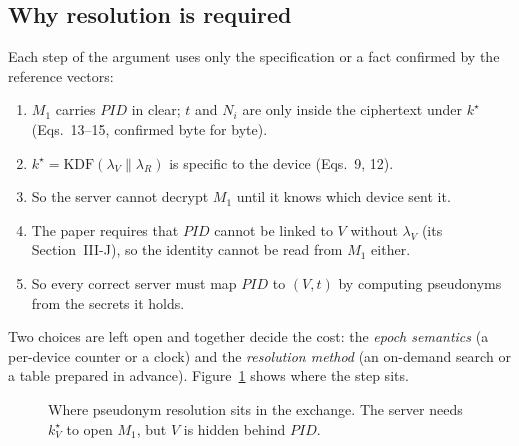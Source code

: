 \subsection*{Why resolution is required}
Each step of the argument uses only the specification or a fact confirmed by the reference vectors:
\begin{enumerate}
\item $M_1$ carries $PID$ in clear; $t$ and $N_i$ are only inside the ciphertext under $k^\star$ (Eqs.~13--15, confirmed byte for byte).
\item $k^\star=\mathrm{KDF}(\lambda_V\|\lambda_R)$ is specific to the device (Eqs.~9, 12).
\item So the server cannot decrypt $M_1$ until it knows which device sent it.
\item The paper requires that $PID$ cannot be linked to $V$ without $\lambda_V$ (its Section~III-J), so the identity cannot be read from $M_1$ either.
\item So every correct server must map $PID$ to $(V,t)$ by computing pseudonyms from the secrets it holds.
\end{enumerate}
Two choices are left open and together decide the cost: the \emph{epoch semantics} (a per-device counter or a clock) and the \emph{resolution method} (an on-demand search or a table prepared in advance). Figure~\ref{fig:flow} shows where the step sits.

\begin{figure}[H]
\centering
{}
\caption{Where pseudonym resolution sits in the exchange. The server needs $k^\star_V$ to open $M_1$, but $V$ is hidden behind $PID$.}
\label{fig:flow}
\end{figure}

